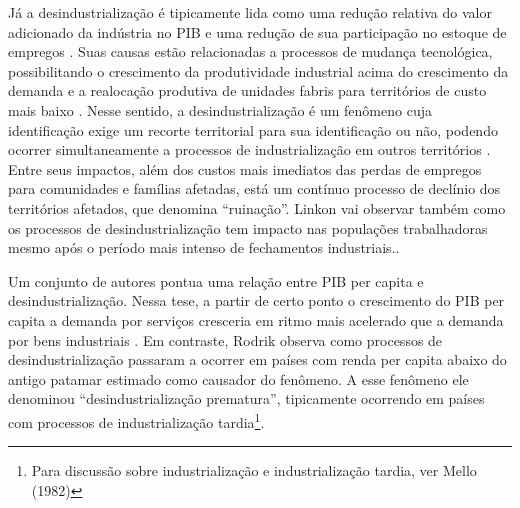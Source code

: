 Já a desindustrialização é tipicamente lida como uma redução relativa do
valor adicionado da indústria no PIB e uma redução de sua participação
no estoque de empregos
\citep{tregenna_characterising_2009}.
Suas causas estão relacionadas a processos de mudança tecnológica,
possibilitando o crescimento da produtividade industrial acima do
crescimento da demanda
\citep{rowthorn_growth_1999} e a realocação produtiva de unidades fabris para territórios de
custo mais baixo
\citep{alderson_explaining_1999}.
Nesse sentido, a desindustrialização é um fenômeno cuja identificação
exige um recorte territorial para sua identificação ou não, podendo
ocorrer simultaneamente a processos de industrialização em outros
territórios \citep{bluestone_deindustrialization_1982}. Entre seus impactos, além dos custos mais imediatos
das perdas de empregos para comunidades e famílias afetadas, está um
contínuo processo de declínio dos territórios afetados, que
\citep{mah_industrial_2012} denomina
``ruinação''. Linkon
\citet{linkon_half-life_2018} vai observar
também como os processos de desindustrialização tem impacto nas
populações trabalhadoras mesmo após o período mais intenso de
fechamentos industriais..

Um conjunto de autores pontua uma relação entre PIB per capita e
desindustrialização. Nessa tese, a partir de certo ponto o crescimento
do PIB per capita a demanda por serviços cresceria em ritmo mais
acelerado que a demanda por bens industriais
\citep{rodrik_premature_2016}. Em
contraste, Rodrik
\citet{rodrik_premature_2016} observa como
processos de desindustrialização passaram a ocorrer em países com renda
per capita abaixo do antigo patamar estimado como causador do fenômeno.
A esse fenômeno ele denominou ``desindustrialização prematura'',
tipicamente ocorrendo em países com processos de industrialização
tardia\footnote{Para discussão sobre industrialização e industrialização
  tardia, ver Mello (1982)}.

